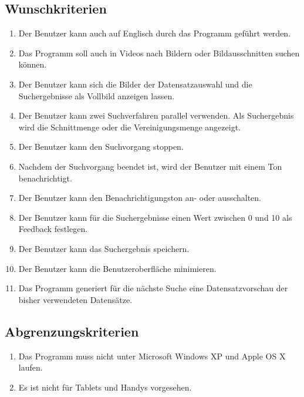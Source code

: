 \subsection{Wunschkriterien}
\begin{enumerate} [label=\bfseries /WK \arabic*0/]
\item Der Benutzer kann auch auf Englisch durch das Programm geführt werden.
\item Das Programm soll auch in Videos nach Bildern oder Bildausschnitten suchen können.
\item Der Benutzer kann sich die Bilder der Datensatzauswahl und die Suchergebnisse als Vollbild anzeigen lassen.
\item Der Benutzer kann zwei Suchverfahren parallel verwenden. Als Suchergebnis wird die Schnittmenge oder die Vereinigungsmenge angezeigt.
\item Der Benutzer kann den Suchvorgang stoppen.
\item Nachdem der Suchvorgang beendet ist, wird der Benutzer mit einem Ton benachrichtigt.
\item Der Benutzer kann den Benachrichtigungston an- oder ausschalten.
\item Der Benutzer kann für die Suchergebnisse einen Wert zwischen 0 und 10 als Feedback festlegen.
\item Der Benutzer kann das Suchergebnis speichern.
\item Der Benutzer kann die Benutzeroberfläche minimieren.
\item Das Programm generiert für die nächste Suche eine Datensatzvorschau der bisher verwendeten Datensätze.
\end{enumerate}
\subsection{Abgrenzungskriterien}
\begin{enumerate} [label=\bfseries /AK \arabic*0/]
\item Das Programm muss nicht unter Microsoft Windows XP und Apple OS X laufen. 
\item Es ist nicht für Tablets und Handys vorgesehen.
\end{enumerate}
